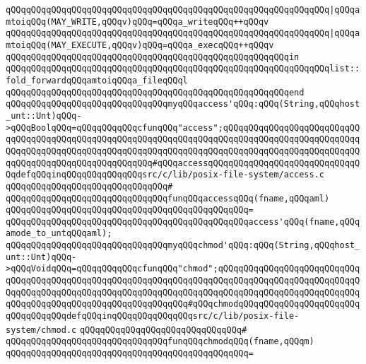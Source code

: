 \verb|qQQqqQQqqQQqqQQqqQQqqQQqqQQqqQQqqQQqqQQqqQQqqQQqqQQqqQQqqQQqqQQq|\verb#|qQQqamtoiqQQq(MAY_WRITE,qQQqv)qQQq=qQQqa_writeqQQq++qQQqv#\newline
\verb|qQQqqQQqqQQqqQQqqQQqqQQqqQQqqQQqqQQqqQQqqQQqqQQqqQQqqQQqqQQqqQQq|\verb#|qQQqamtoiqQQq(MAY_EXECUTE,qQQqv)qQQq=qQQqa_execqQQq++qQQqv#\newline
\verb|qQQqqQQqqQQqqQQqqQQqqQQqqQQqqQQqqQQqqQQqqQQqqQQqqQQqqQQqin|\newline
\verb|qQQqqQQqqQQqqQQqqQQqqQQqqQQqqQQqqQQqqQQqqQQqqQQqqQQqqQQqqQQqqQQqlist::fold_forwardqQQqamtoiqQQqa_fileqQQql|\newline
\verb|qQQqqQQqqQQqqQQqqQQqqQQqqQQqqQQqqQQqqQQqqQQqqQQqqQQqqQQqend|\newline
\newline
\verb|qQQqqQQqqQQqqQQqqQQqqQQqqQQqqQQqmyqQQqaccess'qQQq:qQQq(String,qQQqhost_unt::Unt)qQQq->qQQqBoolqQQq=qQQqqQQqqQQqcfunqQQq"access";qQQqqQQqqQQqqQQqqQQqqQQqqQQqqQQqqQQqqQQqqQQqqQQqqQQqqQQqqQQqqQQqqQQqqQQqqQQqqQQqqQQqqQQqqQQqqQQqqQQqqQQqqQQqqQQqqQQqqQQqqQQqqQQqqQQqqQQqqQQqqQQqqQQqqQQqqQQqqQQqqQQqqQQqqQQqqQQqqQQqqQQqqQQqqQQqqQQq#qQQqaccessqQQqqQQqqQQqqQQqqQQqqQQqqQQqqQQqdefqQQqinqQQqqQQqqQQqqQQqsrc/c/lib/posix-file-system/access.c|\newline
\verb|qQQqqQQqqQQqqQQqqQQqqQQqqQQqqQQq#|\newline
\verb|qQQqqQQqqQQqqQQqqQQqqQQqqQQqqQQqfunqQQqaccessqQQq(fname,qQQqaml)|\newline
\verb|qQQqqQQqqQQqqQQqqQQqqQQqqQQqqQQqqQQqqQQqqQQqqQQq=|\newline
\verb|qQQqqQQqqQQqqQQqqQQqqQQqqQQqqQQqqQQqqQQqqQQqqQQqaccess'qQQq(fname,qQQqamode_to_untqQQqaml);|\newline
\newline
\verb|qQQqqQQqqQQqqQQqqQQqqQQqqQQqqQQqmyqQQqchmod'qQQq:qQQq(String,qQQqhost_unt::Unt)qQQq->qQQqVoidqQQq=qQQqqQQqqQQqcfunqQQq"chmod";qQQqqQQqqQQqqQQqqQQqqQQqqQQqqQQqqQQqqQQqqQQqqQQqqQQqqQQqqQQqqQQqqQQqqQQqqQQqqQQqqQQqqQQqqQQqqQQqqQQqqQQqqQQqqQQqqQQqqQQqqQQqqQQqqQQqqQQqqQQqqQQqqQQqqQQqqQQqqQQqqQQqqQQqqQQqqQQqqQQqqQQqqQQqqQQqqQQqqQQqqQQq#qQQqchmodqQQqqQQqqQQqqQQqqQQqqQQqqQQqqQQqqQQqdefqQQqinqQQqqQQqqQQqqQQqsrc/c/lib/posix-file-system/chmod.c|\newline
\verb|qQQqqQQqqQQqqQQqqQQqqQQqqQQqqQQq#|\newline
\verb|qQQqqQQqqQQqqQQqqQQqqQQqqQQqqQQqfunqQQqchmodqQQq(fname,qQQqm)|\newline
\verb|qQQqqQQqqQQqqQQqqQQqqQQqqQQqqQQqqQQqqQQqqQQqqQQq=|\newline
